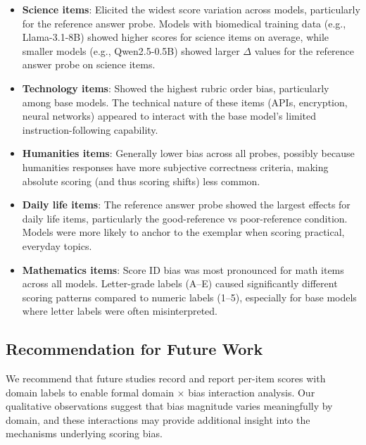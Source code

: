 \begin{itemize}
    \item \textbf{Science items}: Elicited the widest score variation across models, particularly for the reference answer probe. Models with biomedical training data (e.g., Llama-3.1-8B) showed higher scores for science items on average, while smaller models (e.g., Qwen2.5-0.5B) showed larger $\Delta$ values for the reference answer probe on science items.

    \item \textbf{Technology items}: Showed the highest rubric order bias, particularly among base models. The technical nature of these items (APIs, encryption, neural networks) appeared to interact with the base model's limited instruction-following capability.

    \item \textbf{Humanities items}: Generally lower bias across all probes, possibly because humanities responses have more subjective correctness criteria, making absolute scoring (and thus scoring shifts) less common.

    \item \textbf{Daily life items}: The reference answer probe showed the largest effects for daily life items, particularly the good-reference vs poor-reference condition. Models were more likely to anchor to the exemplar when scoring practical, everyday topics.

    \item \textbf{Mathematics items}: Score ID bias was most pronounced for math items across all models. Letter-grade labels (A--E) caused significantly different scoring patterns compared to numeric labels (1--5), especially for base models where letter labels were often misinterpreted.
\end{itemize}

\subsection{Recommendation for Future Work}

We recommend that future studies record and report per-item scores with domain labels to enable formal domain $\times$ bias interaction analysis. Our qualitative observations suggest that bias magnitude varies meaningfully by domain, and these interactions may provide additional insight into the mechanisms underlying scoring bias.

